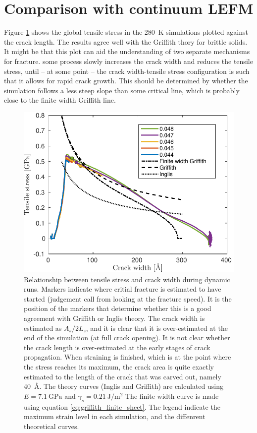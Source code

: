 \section{Comparison with continuum LEFM}
Figure \ref{fig:fracture_theory_compare} shows the global tensile stress in the \SI{280}{\kelvin} simulations plotted against the crack length. The results agree well with the Griffith thory for brittle solids. It might be that this plot can aid the understanding of two separate mechanisms for fracture. some process slowly increases the crack width and reduces the tensile stress, until -- at some point -- the crack width-tensile stress configuration is such that it allows for rapid crack growth. This should be determined by whether the simulation follows a less steep slope than some critical line, which is probably close to the finite width Griffith line.
\begin{figure}
\centering
\includegraphics[width=12cm]{../figures/thesis/fracture_theory_compare.pdf}
\caption{Relationship between tensile stress and crack width during dynamic runs. Markers indicate where critial fracture is estimated to have started (judgement call from looking at the fracture speed). It is the position of the markers that determine whether this is a good agreement with Griffith or Inglis theory. The crack width is estimated as $A_s/2L_z$, and it is clear that it is over-estimated at the end of the simulation (at full crack opening). It is not clear whether the crack length is over-estimated at the early stages of crack propagation. When straining is finished, which is at the point where the stress reaches its maximum, the crack area is quite exactly estimated to the length of the crack that was carved out, namely \SI{40}{\angstrom}. The theory curves (Inglis and Griffith) are calculated using $E=\SI{7.1}{\giga\pascal}$ and $\gamma_s = \SI{0.21}{\joule\per\meter\squared}$ The finite width curve is made using equation \ref{eq:griffith_finite_sheet}. The legend indicate the maximum strain level in each simulation, and the diffenrent theoretical curves.}
\label{fig:fracture_theory_compare}
\end{figure}